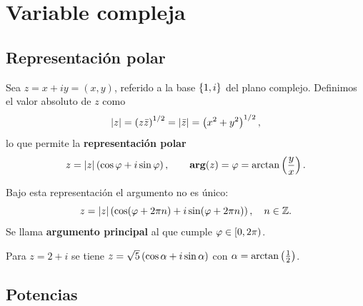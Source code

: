 \section{Variable compleja}
\label{sec:variable_compleja}

\subsection{Representaci\'on polar}
\label{subsec:representacion_polar}

Sea $z=x+iy=(x,y)$, referido a la base $\left\{ 1,i \right\}$ del plano complejo.
Definimos el valor absoluto de $z$ como
\begin{equation}
  \label{eq:modulo}
  \lvert z \rvert=\left( z\bar{z} \right)^{1/2}=\lvert \bar{z} \rvert=\left( x^2+y^2 \right)^{1/2},
\end{equation}
lo que permite la \textbf{representaci\'on polar}
\begin{equation}
  \label{eq:polar_compleja}
  z=\lvert z \rvert\left( \cos\varphi+i\sin\varphi \right),
  \qquad
  \operatorname{\mathbf{arg}}(z)=\varphi=\arctan\left( \frac{y}{x} \right) .
\end{equation}

\begin{observacion}
  Bajo esta representaci\'on el argumento no es \'unico:
  \begin{equation}
    \label{eq:argumento_multivaluado}
    z=\lvert z \rvert\left( \cos(\varphi+2\pi n)+i\sin(\varphi+2\pi n) \right),
    \quad n\in\mathbb{Z} .
  \end{equation}
  Se llama \textbf{argumento principal} al que cumple $\varphi\in[0,2\pi)$.
\end{observacion}

\begin{ejemplo}
  \label{ej:polar}
  Para $z=2+i$ se tiene
  $z=\sqrt{5}\left( \cos\alpha+i\sin\alpha \right)$ con
  $\alpha=\arctan\left( \tfrac{1}{2} \right)$.
\end{ejemplo}

\subsection{Potencias}
\label{subsec:potencias}

